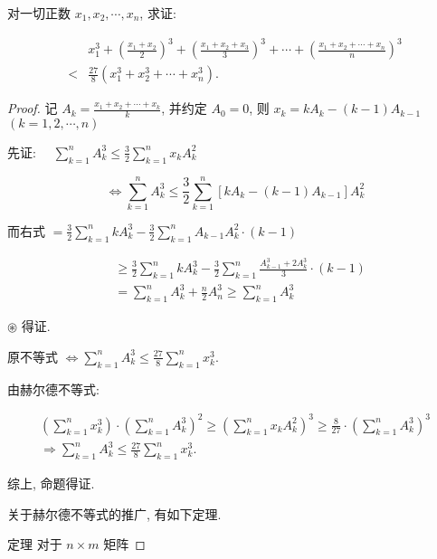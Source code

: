 \begin{example}
	对一切正数 $x_{1}, x_{2}, \cdots, x_{n}$, 求证:
	
	$$
	\begin{aligned}
	& x_{1}^{3}+\left(\frac{x_{1}+x_{2}}{2}\right)^{3}+\left(\frac{x_{1}+x_{2}+x_{3}}{3}\right)^{3}+\cdots+\left(\frac{x_{1}+x_{2}+\cdots+x_{n}}{n}\right)^{3} \\
	< & \frac{27}{8}\left(x_{1}^{3}+x_{2}^{3}+\cdots+x_{n}^{3}\right) .
	\end{aligned}
	$$
\end{example}
\begin{proof}
	记 $A_{k}=\frac{x_{1}+x_{2}+\cdots+x_{k}}{k}$, 并约定 $A_{0}=0$, 则 $x_{k}=k A_{k}-(k-1) A_{k-1}$ $(k=1,2, \cdots, n)$
	
	先证: $\quad \sum_{k=1}^{n} A_{k}^{3} \leqslant \frac{3}{2} \sum_{k=1}^{n} x_{k} A_{k}^{2}$
	
	$$
	\Leftrightarrow \sum_{k=1}^{n} A_{k}^{3} \leqslant \frac{3}{2} \sum_{k=1}^{n}\left[k A_{k}-(k-1) A_{k-1}\right] A_{k}^{2}
	$$
	
	而右式 $=\frac{3}{2} \sum_{k=1}^{n} k A_{k}^{3}-\frac{3}{2} \sum_{k=1}^{n} A_{k-1} A_{k}^{2} \cdot(k-1)$
	
	$$
	\begin{aligned}
	& \geqslant \frac{3}{2} \sum_{k=1}^{n} k A_{k}^{3}-\frac{3}{2} \sum_{k=1}^{n} \frac{A_{k-1}^{3}+2 A_{k}^{3}}{3} \cdot(k-1) \\
	& =\sum_{k=1}^{n} A_{k}^{3}+\frac{n}{2} A_{n}^{3} \geqslant \sum_{k=1}^{n} A_{k}^{3}
	\end{aligned}
	$$
	
	$\circledast$ 得证.
	
	原不等式 $\Leftrightarrow \sum_{k=1}^{n} A_{k}^{3} \leqslant \frac{27}{8} \sum_{k=1}^{n} x_{k}^{3}$.
	
	由赫尔德不等式:
	
	
	\begin{gather*}
	\left(\sum_{k=1}^{n} x_{k}^{3}\right) \cdot\left(\sum_{k=1}^{n} A_{k}^{3}\right)^{2} \geqslant\left(\sum_{k=1}^{n} x_{k} A_{k}^{2}\right)^{3} \geqslant \frac{8}{27} \cdot\left(\sum_{k=1}^{n} A_{k}^{3}\right)^{3} \\
	\Rightarrow \sum_{k=1}^{n} A_{k}^{3} \leqslant \frac{27}{8} \sum_{k=1}^{n} x_{k}^{3} .
	\end{gather*}
	
	
	综上, 命题得证.
	
	关于赫尔德不等式的推广, 有如下定理.
	
	定理 对于 $n \times m$ 矩阵
	

\end{proof}
